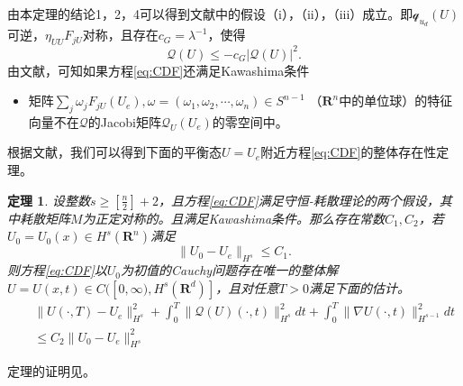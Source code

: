 \documentclass{article}
\newtheorem{theorem}{定理}
\begin{document}
	由本定理的结论1，2，4可以得到文献\cite{}中的假设（i），（ii），（iii）成立。即$\mathcal{q}_{u_d}(U)$可逆，$\eta_{U U} F_{jU}$对称，且存在$c_G = \lambda^{-1}$，使得
	\begin{equation*}
		[\eta_U(U) - \eta_U (U_e)] \mathcal{Q}(U) \le -c_G |\mathcal{Q}(U)|^2.
	\end{equation*}
	由文献\cite{}，可知如果方程\eqref{eq:CDF}还满足Kawashima条件
	\begin{itemize}
		\item 矩阵$\sum_j \omega_j F_{jU}(U_e), \omega = (\omega_1,\omega_2, \cdots,\omega_n) \in S^{n-1}$ （$\mathbf{R}^n$中的单位球）的特征向量不在$\mathcal{Q}$的Jacobi矩阵$\mathcal{Q}_{U}(U_e)$的零空间中。
	\end{itemize}
	根据文献\cite{}，我们可以得到下面的平衡态$U=U_e$附近方程\eqref{eq:CDF}的整体存在性定理。
	\begin{theorem} \label{th:Kawashima}
		设整数$s \ge [\frac{n}{2}]+2$，且方程\eqref{eq:CDF}满足守恒-耗散理论的两个假设，其中耗散矩阵$M$为正定对称的。且满足Kawashima条件。那么存在常数$C_1,C_2$，若$U_0 = U_0(x) \in H^s(\mathbf{R}^n)$满足
		\begin{equation*}
			\|U_0 -U_e\|_{H^s} \le C_1.
		\end{equation*}
		则方程\eqref{eq:CDF}以$U_0$为初值的Cauchy问题存在唯一的整体解$U=U(x,t) \in C([0,\infty),H^s(\mathbf{R}^d)]$，且对任意$T>0$满足下面的估计。
		\begin{eqnarray*}
			&& \|U(\cdot,T) - U_e \|_{H^s}^2 + \int_0^T \| \mathcal{Q}(U)(\cdot,t)\|_{H^s}^2 dt + \int_0^T \|\nabla U (\cdot,t)\|_{H^{s-1}}^2 dt \\
			&& \le C_2 \| U_0 -U_e\|_{H^s}^2
		\end{eqnarray*}
	\end{theorem}
	定理的证明见\cite{}。
\end{document}
